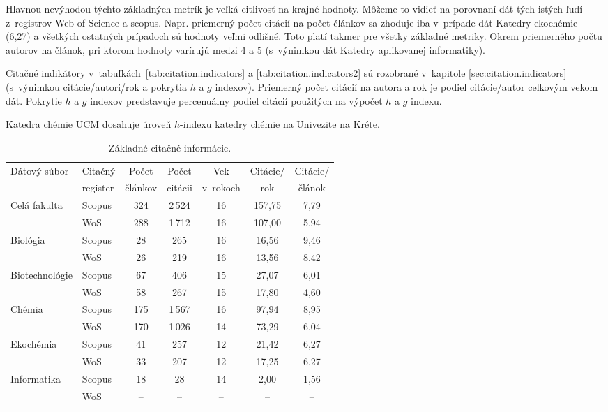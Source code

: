 Hlavnou nevýhodou týchto základných metrík je veľká citlivosť na krajné hodnoty.
Môžeme to vidieť na porovnaní dát tých istých ľudí z~registrov Web of Science a
scopus.  Napr. priemerný počet citácií na počet článkov sa zhoduje iba v~prípade
dát Katedry ekochémie (6,27) a všetkých ostatných prípadoch sú hodnoty veľmi
odlišné.  Toto platí takmer pre všetky základné metriky.  Okrem priemerného
počtu autorov na článok, pri ktorom hodnoty varírujú medzi 4 a 5 (s~výnimkou dát
Katedry aplikovanej informatiky).

Citačné indikátory v~tabuľkách~\ref{tab:citation.indicators} a
\ref{tab:citation.indicators2} sú rozobrané v~kapitole
\ref{sec:citation.indicators} (s~výnimkou citácie/autori/rok a pokrytia $h$ a
$g$ indexov).  Priemerný počet citácií na autora a rok je podiel citácie/autor
celkovým vekom dát.  Pokrytie $h$ a $g$ indexov predstavuje percenuálny podiel
citácií použitých na výpočet $h$ a $g$ indexu.

Katedra chémie UCM dosahuje úroveň $h$-indexu katedry chémie na Univezite na
Kréte. \citep{LAZARIDIS2010}

\begin{table}
\centering\small
\caption{Základné citačné informácie.}
\label{tab:citation.info}
\begin{tabular}{llccccc}
  \hline\noalign{\vspace{.3ex}}
  Dátový súbor & Citačný  & Počet   & Počet   & Vek      & Citácie/ & Citácie/ \\
               & register & článkov & citácii & v~rokoch & rok      & článok   \\[0.3ex]
  \hline\noalign{\vspace{.5ex}}
  Celá fakulta   & Scopus & 324 & 2\,524 & 16 & 157,75 & 7,79 \\
                 & WoS    & 288 & 1\,712 & 16 & 107,00 & 5,94 \\[1ex]
  Biológia       & Scopus &  28 &    265 & 16 &  16,56 & 9,46 \\
                 & WoS    &  26 &    219 & 16 &  13,56 & 8,42 \\[1ex]
  Biotechnológie & Scopus &  67 &    406 & 15 &  27,07 & 6,01 \\
                 & WoS    &  58 &    267 & 15 &  17,80 & 4,60 \\[1ex]
  Chémia         & Scopus & 175 & 1\,567 & 16 &  97,94 & 8,95 \\
                 & WoS    & 170 & 1\,026 & 14 &  73,29 & 6,04 \\[1ex]
  Ekochémia      & Scopus &  41 &    257 & 12 &  21,42 & 6,27 \\
                 & WoS    &  33 &    207 & 12 &  17,25 & 6,27 \\[1ex]
  Informatika    & Scopus &  18 &     28 & 14 &   2,00 & 1,56 \\
                 & WoS    &  -- &     -- & -- &  --    & --   \\[0.5ex]
  \hline
\end{tabular}
\end{table}


